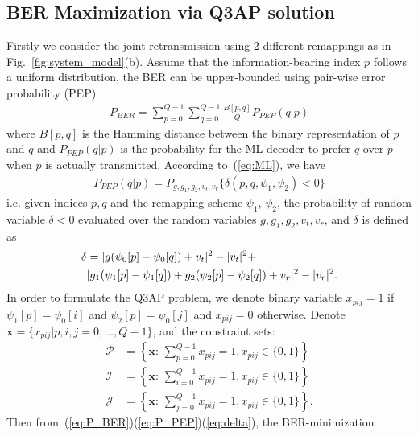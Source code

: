 \documentclass[conference]{IEEEtran}
\begin{document}
\subsection{BER Maximization via Q3AP solution}
Firstly we consider the joint retransmission using 2 different remappings
as in Fig.~\ref{fig:system_model}(b). Assume that the information-bearing index
$p$ follows a uniform distribution, the BER can be upper-bounded using
pair-wise error probability (PEP)~\cite{}
\begin{align}
    P_{BER} = \sum_{p=0}^{Q - 1}\sum_{q=0}^{Q - 1}\frac{B[p,
    q]}{Q}P_{PEP}(q | p) \label{eq:P_BER}
\end{align}
where $B[p,q]$ is the Hamming distance between the binary representation of $p$
and $q$ and $P_{PEP}(q | p)$ is the probability for the ML decoder to prefer $q$
over $p$ when $p$ is actually transmitted. According to~(\ref{eq:ML}), we have
\begin{align}
    P_{PEP}(q | p) = P_{g,g_1,g_2,v_t,v_r}\{\delta(p,q,\psi_1,\psi_2) < 0\}
    \label{eq:P_PEP}
\end{align}
i.e. given indices $p, q$ and the remapping scheme $\psi_1$, $\psi_2$, the
probability of random variable $\delta<0$ evaluated over the random variables
$g,g_1,g_2,v_t,v_r$, and $\delta$ is defined as
\begin{align}
    \delta & = |g(\psi_0[p] - \psi_0[q]) + v_t|^2 - |v_t|^2 +\notag\\ 
    &
    |g_1(\psi_1[p] - \psi_1[q])+g_2(\psi_2[p] - \psi_2[q])+v_r|^2 -
    |v_r|^2.
    \label{eq:delta}
\end{align}
In order to formulate the Q3AP problem, we denote binary variable $x_{pij} = 1$
if $\psi_1[p] = \psi_0[i]$ and $\psi_2[p] = \psi_0[j]$ and $x_{pij} = 0$
otherwise.
Denote $\mathbf{x} = \{x_{pij}|p,i,j=0,\ldots,Q-1\}$, and the
constraint sets:
\begin{subequations}
    \begin{align}
        \mathcal{P} & = \left\{\mathbf{x}:\,\sum_{p=0}^{Q-1}x_{pij} = 1,
        x_{pij}\in\{0, 1\}\right\}
        \\
        \mathcal{I} & = \left\{\mathbf{x}:\,\sum_{i=0}^{Q-1}x_{pij} = 1,
        x_{pij}\in\{0, 1\}\right\}
        \\
        \mathcal{J} & = \left\{\mathbf{x}:\,\sum_{j=0}^{Q-1}x_{pij} = 1,
        x_{pij}\in\{0, 1\}\right\}.
    \end{align}
\end{subequations}
Then from~(\ref{eq:P_BER})(\ref{eq:P_PEP})(\ref{eq:delta}), the BER-minimization
\end{document}
